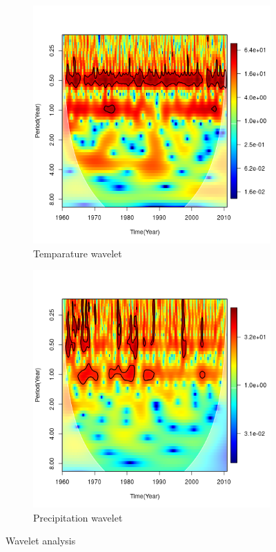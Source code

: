\documentclass[12pt,a4paper]{article}
\begin{document}
\begin{figure}[h]
	\centering
\begin{subfigure}[b]{0.3\textheight}
	\centering
	\includegraphics[width=\linewidth]{waveletT}
	\caption{Temparature wavelet}
	\label{fig:wavelett}
\end{subfigure}
\begin{subfigure}[b]{0.3\textheight}
	\centering
	\includegraphics[width=\linewidth]{waveletP}
	\caption[]{Precipitation wavelet}
	\label{fig:waveletp}
\end{subfigure}
  \caption{Wavelet analysis}\label{fig:trapez}
\end{figure}
\end{document}
